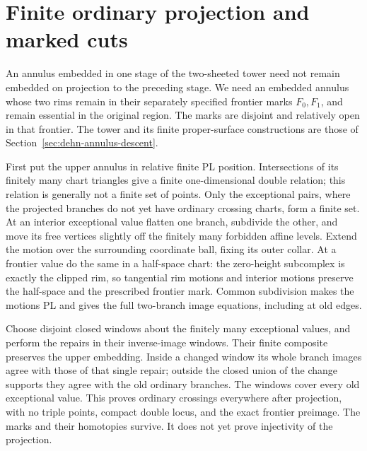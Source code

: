 \section{Finite ordinary projection and marked cuts}
\label{sec:relative-rigidity-cuts}
\label{sec:marked-hierarchy}

An annulus embedded in one stage of the two-sheeted tower need not remain
embedded on projection to the preceding stage. We need an embedded annulus
whose two rims remain in their separately specified frontier marks
$F_0,F_1$, and remain essential in the original region. The marks are
disjoint and relatively open in that frontier. The tower and its finite
proper-surface constructions are those of
Section~\ref{sec:dehn-annulus-descent}.

First put the upper annulus in relative finite PL position. Intersections
of its finitely many chart triangles give a finite one-dimensional double
relation; this relation is generally not a finite set of points. Only the
exceptional pairs, where the projected branches do not yet have ordinary
crossing charts, form a finite set. At an interior exceptional value
flatten one branch, subdivide the other, and move its free vertices
slightly off the finitely many forbidden affine levels. Extend the
motion over the surrounding coordinate ball, fixing its outer collar.
At a frontier value do the same in a half-space chart: the zero-height
subcomplex is exactly the clipped rim, so tangential rim motions and
interior motions preserve the half-space and the prescribed frontier
mark. Common subdivision makes the motions PL and gives the full
two-branch image equations, including at old edges.

Choose disjoint closed windows about the finitely many exceptional
values, and perform the repairs in their inverse-image windows. Their
finite composite preserves the upper embedding. Inside a changed window
its whole branch images agree with those of that single repair; outside
the closed union of the change supports they agree with the old ordinary
branches. The windows cover every old exceptional value. This proves
ordinary crossings everywhere after projection, with no triple points,
compact double locus, and the exact frontier preimage. The marks and their
homotopies survive. It does not yet prove injectivity of the projection.


